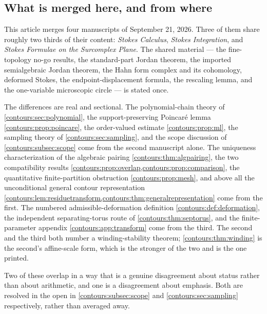\documentclass[11pt,letterpaper]{article}
\theoremstyle{definition}
\theoremstyle{remark}
\numberwithin{equation}{section}
\begin{document}
\subsection{What is merged here, and from where}
This article merges four manuscripts of September 21, 2026. Three of them share
roughly two thirds of their content: \emph{Stokes Calculus}, \emph{Stokes Integration}, and
\emph{Stokes Formulae on the Surcomplex Plane}. The shared material --- the
fine-topology no-go results, the standard-part Jordan theorem, the imported
semialgebraic Jordan theorem, the Hahn form complex and its cohomology, deformed
Stokes, the endpoint-displacement formula, the rescaling lemma, and the
one-variable microscopic circle --- is stated once.

The differences are real and sectional. The polynomial-chain theory of
\cref{contours:sec:polynomial}, the support-preserving Poincar\'e lemma
\cref{contours:prop:poincare}, the order-valued estimate
\cref{contours:prop:ml}, the sampling theory of \cref{contours:sec:sampling}, and
the scope discussion of \cref{contours:subsec:scope} come from the second
manuscript alone. The uniqueness characterization of the algebraic pairing
\cref{contours:thm:algpairing}, the two compatibility results
\cref{contours:prop:overlap,contours:prop:comparison}, the quantitative
finite-partition obstruction \cref{contours:prop:mesh}, and above all the
unconditional general contour representation
\cref{contours:lem:residuetransform,contours:thm:generalrepresentation} come from
the first. The numbered admissible-deformation definition
\cref{contours:def:deformation}, the independent separating-torus route of
\cref{contours:thm:septorus}, and the finite-parameter appendix
\cref{contours:app:transform} come from the third.  The second and the third
both number a winding-stability theorem; \cref{contours:thm:winding} is the
second's affine-scale form, which is the stronger of the two and is the one
printed.

Two of these overlap in a way that is a genuine disagreement about status rather
than about arithmetic, and one is a disagreement about emphasis. Both are resolved
in the open in \cref{contours:subsec:scope} and \cref{contours:sec:sampling}
respectively, rather than averaged away.
\end{document}
